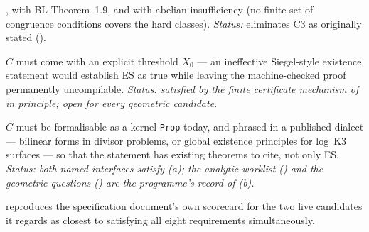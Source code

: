 \documentclass[11pt]{article}
\theoremstyle{plain}
\theoremstyle{definition}
\theoremstyle{remark}
\newcommand{\lean}[1]{\texttt{#1}}
\renewcommand{\_}{\textunderscore\allowbreak}
\begin{document}
\begin{description}[leftmargin=1.6em]
        \cite{GhoshSarnak2022,LoughranMitankin2021,CTWX2020}, with BL Theorem~1.9, and with
        abelian insufficiency (no finite set of congruence conditions covers the hard classes).
        \emph{Status:} eliminates C3 as originally stated ().
  \item[R7 (Effectivity).] $C$ must come with an explicit threshold $X_0$ — an ineffective
        Siegel-style existence statement would establish ES as true while leaving the
        machine-checked proof permanently uncompilable. \emph{Status: satisfied by the finite
        certificate mechanism of  in principle; open for every
        geometric candidate.}
  \item[R8 (Statability now, in a published dialect).] $C$ must be formalisable as
        a kernel \lean{Prop} today, and phrased in a published dialect — bilinear forms in
        divisor problems, or global existence principles for log~K3 surfaces — so that the
        statement has existing theorems to cite, not only ES. \emph{Status: both named
        interfaces satisfy (a); the analytic worklist () and the
        geometric questions () are the programme's record of
        (b).}
\end{description}

 reproduces the specification document's own scorecard for the two live
candidates it regards as closest to satisfying all eight requirements simultaneously.
\end{document}
